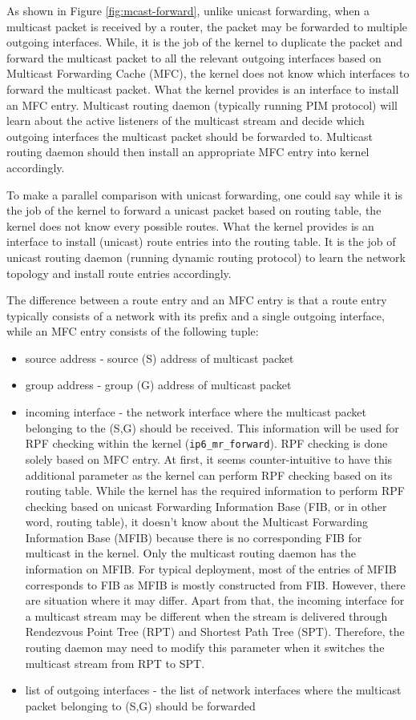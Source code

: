 \documentclass{article}
\begin{document}
As shown in Figure \ref{fig:mcast-forward}, unlike unicast forwarding, when a
multicast packet is received by a router, the packet may be forwarded to
multiple outgoing interfaces. While, it is the job of the kernel to duplicate
the packet and forward the multicast packet to all the relevant outgoing
interfaces based on Multicast Forwarding Cache (MFC), the kernel does not know
which interfaces to forward the multicast packet. What the kernel provides is an
interface to install an MFC entry. Multicast routing daemon (typically running
PIM protocol) will learn about the active listeners of the multicast stream and
decide which outgoing interfaces the multicast packet should be forwarded to.
Multicast routing daemon should then install an appropriate MFC entry into
kernel accordingly.

To make a parallel comparison with unicast forwarding, one could say while it is
the job of the kernel to forward a unicast packet based on routing table, the
kernel does not know every possible routes. What the kernel provides is an
interface to install (unicast) route entries into the routing table. It is the
job of unicast routing daemon (running dynamic routing protocol) to learn the
network topology and install route entries accordingly.

The difference between a route entry and an MFC entry is that a route entry
typically consists of a network with its prefix and a single outgoing interface,
while an MFC entry consists of the following tuple:
\begin{itemize}
  \item source address - source (S) address of multicast packet
  \item group address - group (G) address of multicast packet
  \item incoming interface - the network interface where the multicast packet
  belonging to the (S,G) should be received. This information will be used for
  RPF checking within the kernel (\texttt{ip6\_mr\_forward}). RPF checking is
  done solely based on MFC entry. At first, it seems counter-intuitive to have
  this additional parameter as the kernel can perform RPF checking based on its
  routing table.  While the kernel has the required information to perform RPF
  checking based on unicast Forwarding Information Base (FIB, or in other word,
  routing table), it doesn't know about the Multicast Forwarding Information
  Base (MFIB) because there is no corresponding FIB for multicast in the kernel.
  Only the multicast routing daemon has the information on MFIB. For typical
  deployment, most of the entries of MFIB corresponds to FIB as MFIB is mostly
  constructed from FIB. However, there are situation where it may differ. Apart
  from that, the incoming interface for a multicast stream may be different when
  the stream is delivered through Rendezvous Point Tree (RPT) and Shortest Path
  Tree (SPT). Therefore, the routing daemon may need to modify this parameter when
  it switches the multicast stream from RPT to SPT.
  \item list of outgoing interfaces - the list of network interfaces where the
  multicast packet belonging to (S,G) should be forwarded 
\end{itemize}
\end{document}
